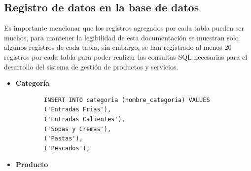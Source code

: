 \subsection{Registro de datos en la base de datos}

  Es importante mencionar que los registros agregados por cada tabla pueden ser muchos, para mantener la legibilidad de esta documentación se muestran solo algunos registros de cada tabla, sin embargo, se han registrado al menos 20 registros por cada tabla para poder realizar las consultas SQL necesarias para el desarrollo del sistema de gestión de productos y servicios.

\begin{itemize}
  \item \textbf{Categoría}
  \begin{listing}[H]
        \centering
        \begin{verbatim}
        INSERT INTO categoria (nombre_categoria) VALUES
        ('Entradas Frias'),
        ('Entradas Calientes'),
        ('Sopas y Cremas'),
        ('Pastas'),
        ('Pescados');
        \end{verbatim}
        \caption{Fragmento de código SQL para la inserción de registros en la tabla \texttt{categoria}.}
        \label{lst:insert_categoria}
    \end{listing}
    \item \textbf{Producto}

\end{itemize}
